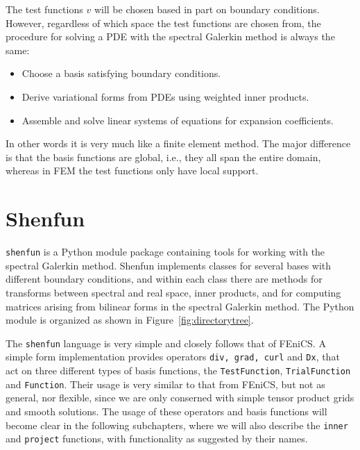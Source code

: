 \documentclass[%
oneside,                 %
final,                   %
10pt]{article}
\begin{document}
The test functions $v$ will be chosen based in part on boundary conditions. However, regardless of which space the test functions are chosen from, the procedure for solving a PDE with the spectral Galerkin method is always the same:

\begin{itemize}
  \item Choose a basis satisfying boundary conditions.

  \item Derive variational forms from PDEs using  weighted inner products.

  \item Assemble and solve linear systems of equations for expansion coefficients.
\end{itemize}

\noindent
In other words it is very much like a finite element method. The major difference is that the basis functions are global, i.e., they all span the entire domain, whereas in FEM the test functions only have local support.

\section{Shenfun}
\label{sec:shenfun}
\texttt{shenfun} is a Python module package containing tools for working with the spectral Galerkin method. Shenfun implements classes for several bases with different boundary conditions, and within each class there are methods for transforms between spectral and real space, inner products, and for computing matrices arising from bilinear forms in the spectral Galerkin method. The Python module is organized as shown in Figure~\ref{fig:directorytree}. 

The \texttt{shenfun} language is very simple and closely follows that of FEniCS. A simple form implementation provides operators \texttt{div, grad, curl} and \texttt{Dx}, that act on three different types of basis functions, the \texttt{TestFunction}, \texttt{TrialFunction} and \texttt{Function}. Their usage is very similar to that from FEniCS, but not as general, nor flexible, since we are only conserned with simple tensor product grids and smooth solutions. The usage of these operators and basis functions will become clear in the following subchapters, where we will also describe the \texttt{inner} and \texttt{project} functions, with functionality as suggested by their names.
\end{document}
